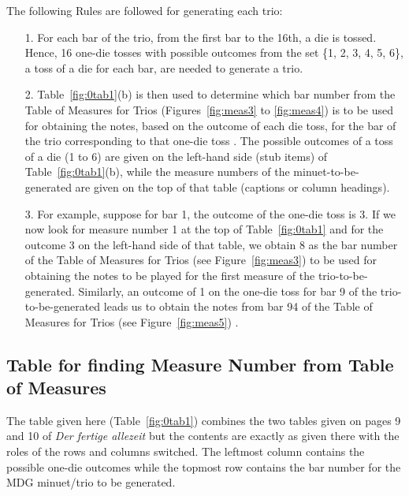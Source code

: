 \documentclass[a4paper,x11names,svgnames,10pt]{article}
\begin{document}
The following Rules are followed for generating each trio:
\begin{enumerate}
	\item [1.] For each bar of the trio, from the first bar to the 16th, a die is tossed.  Hence, 16 one-die tosses with possible outcomes from the set \{1, 2, 3, 4, 5, 6\}, a toss of a die for each bar, are needed to generate a trio.   
	\item [2.] Table~\ref{fig:0tab1}(b) is then used to determine which bar number from the Table of Measures for Trios (Figures~\ref{fig:meas3} to \ref{fig:meas4}) is to be used for obtaining the notes, based on the outcome of each die toss, for the bar of the trio corresponding to that one-die toss .  The possible outcomes of a toss of a die (1 to 6) are given on the left-hand side  (stub items) of Table~\ref{fig:0tab1}(b), while the measure numbers of the minuet-to-be-generated are given on the top of that table (captions or column  headings).
	\item [3.]  For example, suppose for bar 1, the outcome of the one-die toss is 3.  If we now look for measure number 1 at the top of Table~\ref{fig:0tab1} and for the outcome 3 on the left-hand side of that table, we obtain 8 as the bar number of the Table of Measures for Trios (see Figure~\ref{fig:meas3}) to be used for obtaining the notes to be played for the first measure of the trio-to-be-generated.  Similarly, an outcome of 1 on the one-die toss for bar 9 of the trio-to-be-generated leads us to obtain the notes from bar 94 of the Table of Measures for Trios (see Figure~\ref{fig:meas5}) .
\end{enumerate}   


\subsection{Table for finding Measure Number from Table of Measures}\label{tableFind}
The table given here (Table~\ref{fig:0tab1}) combines the two tables given on pages 9 and 10 of {\it Der fertige allezeit} but the contents are exactly as given there with the roles of the rows and columns switched.  The leftmost column contains the possible one-die outcomes while the topmost row contains the bar number for the MDG minuet/trio to be generated. 
\end{document}

